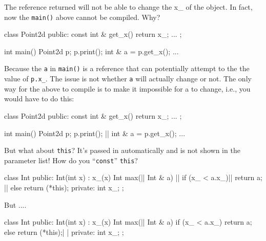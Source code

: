 \begin{consolethree}[escapeinside=||]
class Point2d
{
public:
    || int & get_x()
    {
        return x_;
    }
    ...
\end{consolethree}

The reference returned will not be able to change the x\_ of the object.
In fact, now the \texttt{main()} above cannot be compiled. Why?

\begin{consolethree}[escapeinside=||]
class Point2d
{
public:
    const int & get_x()
    {
        return x_;
    }
    ...
};

int main()
{
    Point2d p;
    p.print();
    int & a = p.get_x();
    ...
}
\end{consolethree}

Because the \texttt{a} in \texttt{main()} is a reference that can
potentially attempt to the the value of \texttt{p.x\_}. The issue is not
whether \texttt{a} will actually change or not. The only way for the above
to compile is to make it impossible for a to change, i.e., you would
have to do this:

\begin{consolethree}[escapeinside=||]
class Point2d
{
public:
    const int & get_x()
    {
        return x_;
    }
    ...
};

int main()
{
    Point2d p;
    p.print();
    || int & a = p.get_x();
    ...
}
\end{consolethree}


\newpage{}

But what about \texttt{this}? It's passed in automatically and is not shown in the parameter list! How do you ``\texttt{const}'' \texttt{this}?

\begin{consolethree}[escapeinside=||]
class Int
{
public:
    Int(int x)
        : x_(x)
    {}
    Int max(|| Int & a)    ||
    {
        if (x_ < a.x_)||
            return a;                    ||
        else
            return (*this);
    }
private:
    int x_;
};
\end{consolethree}

But ....

\begin{consolethree}[escapeinside=||]
class Int
{
public:
    Int(int x)
        : x_(x)
    {}
    Int max(|| Int & a)
    {
        if (x_ < a.x_)
            return a;
        else
            return (*this);| |
    }
private:
    int x_;
};
\end{consolethree}

